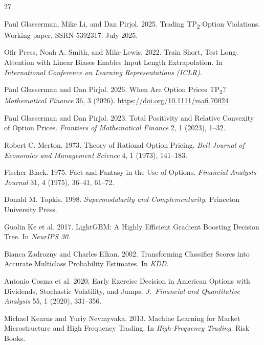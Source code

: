 \documentclass[sigconf,review]{acmart}
\begin{document}

\begingroup
\footnotesize
\setlength{\itemsep}{0pt}
\setlength{\parskip}{0pt}
\begin{thebibliography}{27}

Paul Glasserman, Mike Li, and Dan Pirjol. 2025. Trading TP\textsubscript{2} Option Violations. Working paper, SSRN 5392317. July 2025.

Ofir Press, Noah A. Smith, and Mike Lewis. 2022. Train Short, Test Long: Attention with Linear Biases Enables Input Length Extrapolation. In \textit{International Conference on Learning Representations (ICLR)}.

Paul Glasserman and Dan Pirjol. 2026. When Are Option Prices TP\textsubscript{2}? \textit{Mathematical Finance} 36, 3 (2026). \url{https://doi.org/10.1111/mafi.70024}

Paul Glasserman and Dan Pirjol. 2023. Total Positivity and Relative Convexity of Option Prices. \textit{Frontiers of Mathematical Finance} 2, 1 (2023), 1--32.

Robert C. Merton. 1973. Theory of Rational Option Pricing. \textit{Bell Journal of Economics and Management Science} 4, 1 (1973), 141--183.

Fischer Black. 1975. Fact and Fantasy in the Use of Options. \textit{Financial Analysts Journal} 31, 4 (1975), 36--41, 61--72.

Donald M. Topkis. 1998. \textit{Supermodularity and Complementarity}. Princeton University Press.

Guolin Ke et al. 2017. LightGBM: A Highly Efficient Gradient Boosting Decision Tree. In \textit{NeurIPS 30}.

Bianca Zadrozny and Charles Elkan. 2002. Transforming Classifier Scores into Accurate Multiclass Probability Estimates. In \textit{KDD}.

Antonio Cosma et al. 2020. Early Exercise Decision in American Options with Dividends, Stochastic Volatility, and Jumps. \textit{J.\ Financial and Quantitative Analysis} 55, 1 (2020), 331--356.

Michael Kearns and Yuriy Nevmyvaka. 2013. Machine Learning for Market Microstructure and High Frequency Trading. In \textit{High-Frequency Trading}. Risk Books.


\end{thebibliography}
\end{document}

